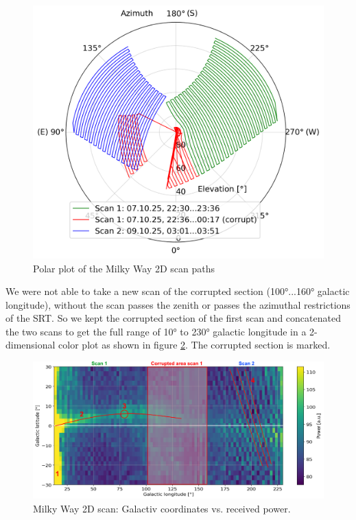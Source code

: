 \begin{figure}[H]
    \centering
    \includegraphics[width=12cm]{assets/mw2d_polar_plot.png}
    \caption{Polar plot of the Milky Way 2D scan paths}
    \label{fig:mw_2d_polar}
\end{figure}

We were not able to take a new scan of the corrupted section (100°...160° galactic longitude), without the scan passes the zenith or passes the azimuthal restrictions of the SRT. So we kept the corrupted section of the first scan and concatenated the two scans to get the full range of 10° to 230° galactic longitude in a 2-dimensional color plot as shown in figure \ref{fig:mw_2d_plot}. The corrupted section is marked.

\pagebreak

\begin{figure}[H]
    \centering
    \includegraphics[width=\textwidth]{assets/mw2d_powermap_edit.png}
    \caption{Milky Way 2D scan: Galactiv coordinates vs. received power.}
    \label{fig:mw_2d_plot}
\end{figure}

